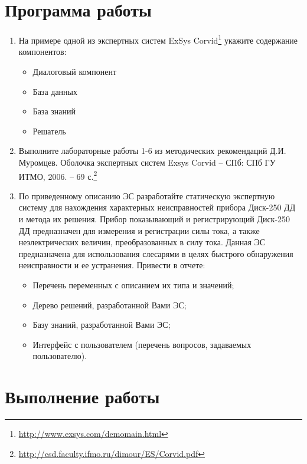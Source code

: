 





\tableofcontents
\newpage

\section{Программа работы}

\begin{enumerate}
	\item На примере одной из экспертных систем ExSys Corvid\footnote{\url{http://www.exsys.com/demomain.html}} укажите содержание компонентов:
	\begin{itemize}
		\item Диалоговый компонент
		\item База данных
		\item База знаний
		\item Решатель
	\end{itemize}
	\item Выполните лабораторные работы 1-6 из методических рекомендаций Д.И. Муромцев. Оболочка экспертных систем Exsys Corvid – СПб: СПб ГУ ИТМО, 2006. – 69 с.\footnote{\url{http://csd.faculty.ifmo.ru/dimour/ES/Corvid.pdf}}
	\item По приведенному описанию ЭС разработайте статическую экспертную систему для нахождения характерных неисправностей прибора Диск-250 ДД и метода их решения. Прибор показывающий и регистрирующий Диск-250 ДД предназначен для измерения и регистрации силы тока, а также неэлектрических величин, преобразованных в силу тока. Данная ЭС предназначена для использования слесарями в целях быстрого обнаружения неисправности и ее устранения. Привести в отчете:
	\begin{itemize}
		\item Перечень переменных с описанием их типа и значений;
		\item Дерево решений, разработанной Вами ЭС;
		\item Базу знаний, разработанной Вами ЭС;
		\item Интерфейс с пользователем (перечень вопросов, задаваемых пользователю).
	\end{itemize}
\end{enumerate}

\newpage

\section{Выполнение работы}

